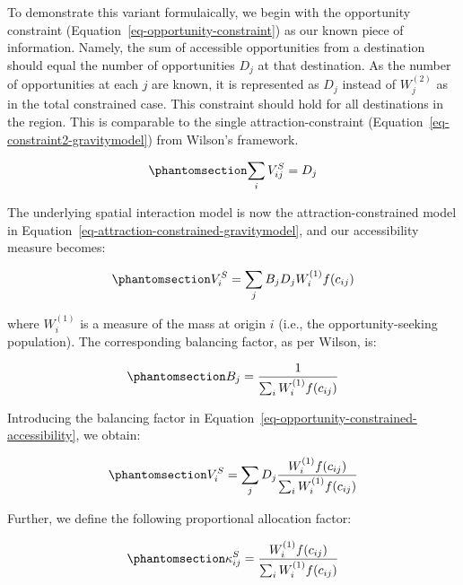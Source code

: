 \documentclass[
]{article}
\begin{document}
To demonstrate this variant formulaically, we begin with the opportunity
constraint (Equation~\ref{eq-opportunity-constraint}) as our known piece
of information. Namely, the sum of accessible opportunities from a
destination should equal the number of opportunities \(D_j\) at that
destination. As the number of opportunities at each \(j\) are known, it
is represented as \(D_j\) instead of \(W_j^(2)\) as in the total
constrained case. This constraint should hold for all destinations in
the region. This is comparable to the single attraction-constraint
(Equation~\ref{eq-constraint2-gravitymodel}) from Wilson's framework.

\begin{equation}\phantomsection\label{eq-opportunity-constraint}{
\sum_i V^S_{ij} =  D_j
}\end{equation}

The underlying spatial interaction model is now the
attraction-constrained model in
Equation~\ref{eq-attraction-constrained-gravitymodel}, and our
accessibility measure becomes:

\begin{equation}\phantomsection\label{eq-opportunity-constrained-accessibility}{
V^S_{i} = \sum_j B_j D_j W_i^{(1)} f(c_{ij})
}\end{equation}

\noindent where \(W_i^{(1)}\) is a measure of the mass at origin \(i\)
(i.e., the opportunity-seeking population). The corresponding balancing
factor, as per Wilson, is:

\begin{equation}\phantomsection\label{eq-opportunity-constrained-proportionality-constants}{
B_j = \frac{1}{\sum_i W_i^{(1)} f(c_{ij})}
}\end{equation}

Introducing the balancing factor in
Equation~\ref{eq-opportunity-constrained-accessibility}, we obtain:

\begin{equation}\phantomsection\label{eq-opportunity-constrained-accessibility-with-balancing-factor}{
V^S_{i} = \sum_j D_j \frac{W_i^{(1)} f(c_{ij})}{\sum_i W_i^{(1)} f(c_{ij})}
}\end{equation}

Further, we define the following proportional allocation factor:

\begin{equation}\phantomsection\label{eq-opportunity-constrained-proportional-allocation-factor}{
\kappa^S_{ij} = \frac{W_i^{(1)} f(c_{ij})}{\sum_i W_i^{(1)} f(c_{ij})}
}\end{equation}
\end{document}
